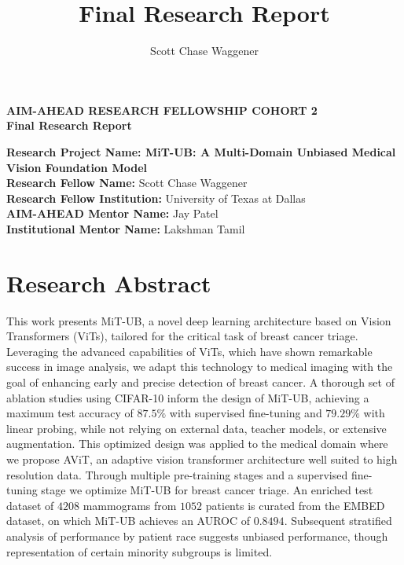 \documentclass[12pt]{article}
\title{Final Research Report}
\author{Scott Chase Waggener}
\renewcommand{\large}{\fontsize{12}{14}\selectfont}
\renewcommand{\headrulewidth}{0pt}
\begin{document}
\fancypagestyle{plain}{
  \fancyhf{}
  \fancyfoot[C]{\thepage}
  \fancyhead[R]{V1 9/2023}
  \renewcommand{\headrulewidth}{0pt}
}
\pagestyle{plain}


\begin{titlepage}
    \centering
    \vspace*{1in}
    \large \textbf{AIM-AHEAD RESEARCH FELLOWSHIP COHORT 2} \\
    \vspace{1\baselineskip}
    \large \textbf{Final Research Report} \\
    \vspace{2\baselineskip}
    \raggedright
    \textbf{Research Project Name: MiT-UB: A Multi-Domain Unbiased Medical Vision Foundation Model} \\[2\baselineskip]
    \large \textbf{Research Fellow Name:} Scott Chase Waggener \\[2\baselineskip]
    \large \textbf{Research Fellow Institution:} University of Texas at Dallas \\[2\baselineskip]
    \large \textbf{AIM-AHEAD Mentor Name:} Jay Patel \\[2\baselineskip]
    \large \textbf{Institutional Mentor Name:} Lakshman Tamil
\end{titlepage}

\newpage
\section{Research Abstract}
\noindent
This work presents MiT-UB, a novel deep learning architecture based on Vision Transformers
(ViTs), tailored for the critical task of breast cancer triage. Leveraging the advanced capabilities
of ViTs, which have shown remarkable success in image analysis, we adapt this technology to
medical imaging with the goal of enhancing early and precise detection of breast cancer.
A thorough set of ablation studies using CIFAR-10 inform the design of MiT-UB, achieving a maximum test accuracy of
$87.5\%$ with supervised fine-tuning and $79.29\%$ with linear probing, while not relying on external data, teacher models,
or extensive augmentation.
This optimized design was applied to the medical domain where we propose AViT, an adaptive vision transformer architecture
well suited to high resolution data. Through multiple pre-training stages and a supervised fine-tuning stage we optimize
MiT-UB for breast cancer triage. An enriched test dataset of $4208$ mammograms from $1052$ patients is curated from the EMBED dataset, on which MiT-UB achieves an AUROC of $0.8494$. Subsequent stratified analysis of performance by patient race
suggests unbiased performance, though representation of certain minority subgroups is limited. 
\end{document}
